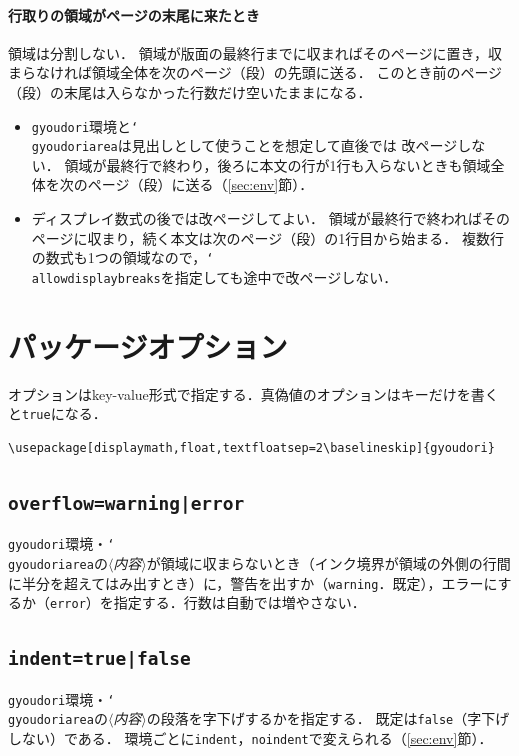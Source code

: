 \documentclass[paper=a4,dvipdfmx]{jlreq}
\newcommand\opt[1]{\texttt{#1}}
\newcommand\env[1]{\texttt{#1}}
\newcommand\cs[1]{\texttt{\char`\\#1}}
\newcommand\meta[1]{$\langle$\textit{#1}$\rangle$}
\begin{document}
\paragraph{行取りの領域がページの末尾に来たとき}
領域は分割しない．
領域が版面の最終行までに収まればそのページに置き，収まらなければ領域全体を次のページ（段）の先頭に送る．
このとき前のページ（段）の末尾は入らなかった行数だけ空いたままになる．
\begin{itemize}
\item \env{gyoudori}環境と\cs{gyoudoriarea}は見出しとして使うことを想定して直後では
 改ページしない．
 領域が最終行で終わり，後ろに本文の行が1行も入らないときも領域全体を次のページ（段）に送る（\ref{sec:env}\nobreak 節）．
\item ディスプレイ数式の後では改ページしてよい．
 領域が最終行で終わればそのページに収まり，続く本文は次のページ（段）の1行目から始まる．
 複数行の数式も1つの領域なので，\cs{allowdisplaybreaks}を指定しても途中で改ページしない．
\end{itemize}

\section{パッケージオプション}

オプションはkey-value形式で指定する．真偽値のオプションはキーだけを書くと\opt{true}になる．
\begin{verbatim}
\usepackage[displaymath,float,textfloatsep=2\baselineskip]{gyoudori}
\end{verbatim}

\subsection{\opt{overflow=warning|error}}
\label{sec:overflow}

\env{gyoudori}環境・\cs{gyoudoriarea}の\meta{内容}が領域に収まらないとき（インク境界が領域の外側の行間に半分を超えてはみ出すとき）に，警告を出すか（\opt{warning}．既定），エラーにするか（\opt{error}）を指定する．行数は自動では増やさない．

\subsection{\opt{indent=true|false}}
\label{sec:indent}

\env{gyoudori}環境・\cs{gyoudoriarea}の\meta{内容}の段落を字下げするかを指定する．
既定は\opt{false}（字下げしない）である．
環境ごとに\opt{indent}，\opt{noindent}で変えられる（\ref{sec:env}\nobreak 節）．
\end{document}
